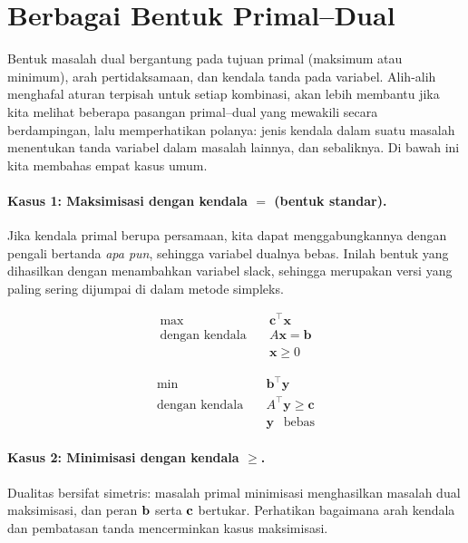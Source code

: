 \section{Berbagai Bentuk Primal--Dual}
\label{sec:duality-forms}

Bentuk masalah dual bergantung pada tujuan primal (maksimum atau minimum), arah pertidaksamaan, dan kendala tanda pada variabel. Alih-alih menghafal aturan terpisah untuk setiap kombinasi, akan lebih membantu jika kita melihat beberapa pasangan primal--dual yang mewakili secara berdampingan, lalu memperhatikan polanya: jenis kendala dalam suatu masalah menentukan tanda variabel dalam masalah lainnya, dan sebaliknya. Di bawah ini kita membahas empat kasus umum.

\paragraph{Kasus 1: Maksimisasi dengan kendala $=$ (bentuk standar).}
Jika kendala primal berupa persamaan, kita dapat menggabungkannya dengan pengali bertanda \emph{apa pun}, sehingga variabel dualnya bebas. Inilah bentuk yang dihasilkan dengan menambahkan variabel slack, sehingga merupakan versi yang paling sering dijumpai di dalam metode simpleks.

\par\noindent
\begin{tcolorbox}[title=Primal (P), colback=blue!5, colframe=blue!40!black]
\[
\begin{aligned}
\max\ & \mathbf{c}^\top \mathbf{x} \\
\text{dengan kendala} \quad & A \mathbf{x} = \mathbf{b} \\
& \mathbf{x} \geq 0
\end{aligned}
\]
\end{tcolorbox}

\medskip

\begin{tcolorbox}[title=Dual (D), colback=green!5, colframe=green!40!black]
\[
\begin{aligned}
\min\ & \mathbf{b}^\top \mathbf{y} \\
\text{dengan kendala} \quad & A^\top \mathbf{y} \geq \mathbf{c} \\
& \mathbf{y} \ \ \text{ bebas}
\end{aligned}
\]
\end{tcolorbox}
\par

\paragraph{Kasus 2: Minimisasi dengan kendala $\geq$.}
Dualitas bersifat simetris: masalah primal minimisasi menghasilkan masalah dual maksimisasi, dan peran $\mathbf{b}$ serta $\mathbf{c}$ bertukar. Perhatikan bagaimana arah kendala dan pembatasan tanda mencerminkan kasus maksimisasi.

